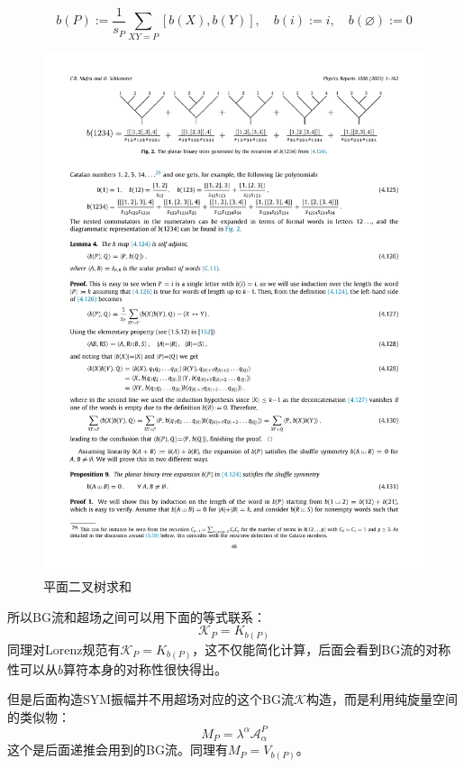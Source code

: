 \begin{equation}
	b(P):=\frac{1}{s_P}\sum_{XY=P}[b(X),b(Y)],\quad b(i):=i,\quad b(\varnothing):=0
\end{equation}
\begin{figure}[htbp]
	\centering
	\includegraphics[width=\linewidth]{figs/fig15.pdf}
	\caption{平面二叉树求和}
	\label{fig:6.8}
\end{figure}
所以BG流和超场之间可以用下面的等式联系：
\begin{equation}
	\boxed{
		\mathcal{K}_P=K_{b(P)}
	}
\end{equation}
同理对Lorenz规范有$\mathcal{K}_P=K_{b(P)}$，这不仅能简化计算，后面会看到BG流的对称性可以从$b$算符本身的对称性很快得出。

但是后面构造SYM振幅并不用超场对应的这个BG流$\mathcal{K}$构造，而是利用纯旋量空间的类似物：
\begin{equation}
	M_P=\lambda^\alpha\mathcal{A}_\alpha^P
\end{equation}
这个是后面递推会用到的BG流。同理有$M_P=V_{b(P)}$。
